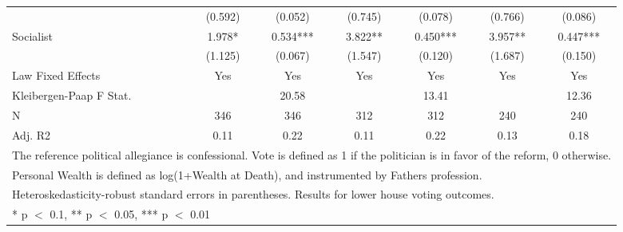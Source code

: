 \begin{table}
\begin{tabular}[t]{lcccccc}
 & (\num{0.592}) & (\num{0.052}) & (\num{0.745}) & (\num{0.078}) & (\num{0.766}) & (\num{0.086})\\
Socialist & \num{1.978}* & \num{0.534}*** & \num{3.822}** & \num{0.450}*** & \num{3.957}** & \num{0.447}***\\
 & (\num{1.125}) & (\num{0.067}) & (\num{1.547}) & (\num{0.120}) & (\num{1.687}) & (\num{0.150})\\
\midrule
Law Fixed Effects & Yes & Yes & Yes & Yes & Yes & Yes\\
Kleibergen-Paap F Stat. &  & 20.58 &  & 13.41 &  & 12.36\\
N & \num{346} & \num{346} & \num{312} & \num{312} & \num{240} & \num{240}\\
Adj. R2 & \num{0.11} & \num{0.22} & \num{0.11} & \num{0.22} & \num{0.13} & \num{0.18}\\
\bottomrule
\multicolumn{7}{l}{\rule{0pt}{1em}The reference political allegiance is confessional. Vote is defined as 1 if the politician is in favor of the reform, 0 otherwise.}\\
\multicolumn{7}{l}{\rule{0pt}{1em}Personal Wealth is defined as log(1+Wealth at Death), and instrumented by Fathers profession.}\\
\multicolumn{7}{l}{\rule{0pt}{1em}Heteroskedasticity-robust standard errors in parentheses. Results for lower house voting outcomes.}\\
\multicolumn{7}{l}{\rule{0pt}{1em}* p $<$ 0.1, ** p $<$ 0.05, *** p $<$ 0.01}\\
\end{tabular}
\end{table}
